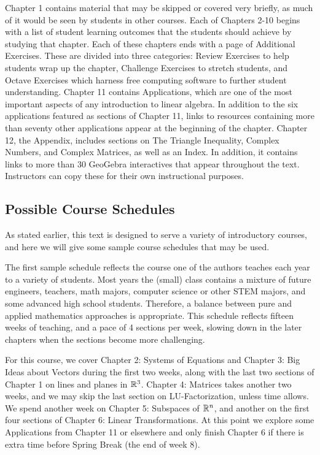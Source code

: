 \documentclass{ximera}
\begin{document}
Chapter 1 contains material that may be skipped or covered very briefly, as much of it would be seen by students in other courses.  Each of Chapters 2-10 begins with a list of student learning outcomes that the students should achieve by studying that chapter.  Each of these chapters ends with a page of Additional Exercises.  These are divided into three categories: Review Exercises to help students wrap up the chapter, Challenge Exercises to stretch students, and Octave Exercises which harness free computing software to further student understanding.  Chapter 11 contains Applications, which are one of the most important aspects of any introduction to linear algebra.  In addition to the six applications featured as sections of Chapter 11, links to resources containing more than seventy other applications appear at the beginning of the chapter.  Chapter 12, the Appendix, includes sections on The Triangle Inequality, Complex Numbers, and Complex Matrices, as well as an Index.  In addition, it contains links to more than 30 GeoGebra interactives that appear throughout the text.  Instructors can copy these for their own instructional purposes.


\subsection*{Possible Course Schedules}

As stated earlier, this text is designed to serve a variety of introductory courses, and here we will give some sample course schedules that may be used.

The first sample schedule reflects the course one of the authors teaches each year to a variety of students.  Most years the (small) class contains a mixture of future engineers, teachers, math majors, computer science or other STEM majors, and some advanced high school students.  Therefore, a balance between pure and applied mathematics approaches is appropriate.  This schedule reflects fifteen weeks of teaching, and a pace of 4 sections per week, slowing down in the later chapters when the sections become more challenging.  

For this course, we cover Chapter 2: Systems of Equations and Chapter 3: Big Ideas about Vectors during the first two weeks, along with the last two sections of Chapter 1 on lines and planes in $\mathbb{R}^3$.  Chapter 4: Matrices takes another two weeks, and we may skip the last section on LU-Factorization, unless time allows.  We spend another week on Chapter 5: Subspaces of $\mathbb{R}^n$, and another on the first four sections of Chapter 6: Linear Transformations.  At this point we explore some Applications from Chapter 11 or elsewhere and only finish Chapter 6 if there is extra time before Spring Break (the end of week 8).
\end{document}
